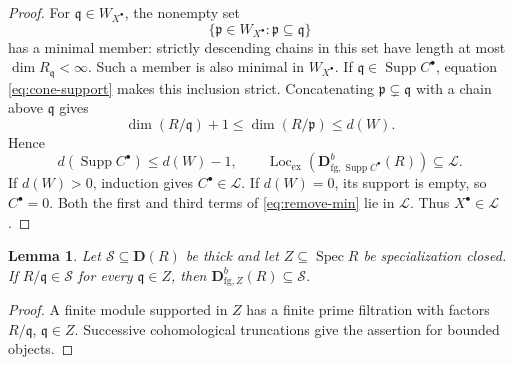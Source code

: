 \documentclass[11pt]{amsart}
\numberwithin{equation}{section}
\newtheorem{lemma}[theorem]{Lemma}
\theoremstyle{definition}
\theoremstyle{remark}
\DeclareMathOperator{\Supp}{Supp}
\DeclareMathOperator{\Spec}{Spec}
\DeclareMathOperator{\Loc}{Loc}
\newcommand{\D}{\mathbf D}
\newcommand{\fg}{\mathrm{fg}}
\newcommand{\Lex}{\Loc_{\mathrm{ex}}}
\newcommand{\p}{\mathfrak p}
\newcommand{\q}{\mathfrak q}
\begin{document}
\begin{proof}
For $\q\in W_{X^\bullet}$, the nonempty set
\[
 \{\p\in W_{X^\bullet}:\p\subseteq\q\}
\]
has a minimal member: strictly descending chains in this set have
length at most $\dim R_\q<\infty$. Such a member is also minimal in
$W_{X^\bullet}$. If $\q\in\Supp C^\bullet$, equation
\eqref{eq:cone-support} makes this inclusion strict. Concatenating
$\p\subsetneq\q$ with a chain above $\q$ gives
\[
 \dim(R/\q)+1\le\dim(R/\p)\le d(W).
\]
Hence
\[
 d(\Supp C^\bullet)\le d(W)-1,\qquad
 \Lex(\D^b_{\fg,\Supp C^\bullet}(R))\subseteq\mathcal L.
\]
If $d(W)>0$, induction gives $C^\bullet\in\mathcal L$.
If $d(W)=0$, its support is empty, so $C^\bullet=0$.
Both the first and third terms of \eqref{eq:remove-min} lie in
$\mathcal L$. Thus $X^{\bullet}\in\mathcal L$.
\end{proof}

\begin{lemma}\label{lem:prime-filtration}
Let $\mathcal S\subseteq\D(R)$ be thick and let $Z\subseteq\Spec R$
be specialization closed.
If $R/\q\in\mathcal S$ for every $\q\in Z$, then
$\D^b_{\fg,Z}(R)\subseteq\mathcal S$.
\end{lemma}
\begin{proof}
A finite module supported in $Z$ has a finite prime filtration with factors
$R/\q$, $\q\in Z$. Successive cohomological truncations give the assertion for bounded objects.
\end{proof}
\end{document}
